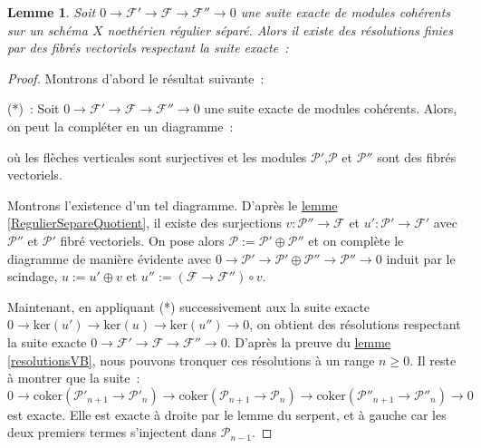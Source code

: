 \documentclass{amsart}
\newcommand{\sref}[2]{\hyperref[#2]{#1 \ref*{#2}}}
\theoremstyle{plain}
\newtheorem{lem}[theo]{Lemme}
\theoremstyle{definition}
\theoremstyle{remark}
\newcommand{\ra}{\rightarrow}
\newcommand{\exa}[3]{0\ra {#1}\ra {#2}\ra {#3}\ra 0}
\newcommand{\myker}[1]{\mathrm{ker}({#1})}
\newcommand{\coker}[1]{\mathrm{coker}({#1})}
\begin{document}
\begin{lem}\label{ferAChevalVB}
  Soit $\exa{\mathcal{F}'}{\mathcal{F}}{\mathcal{F}''}$ une suite exacte de modules cohérents sur un schéma $X$ noethérien régulier séparé.
  Alors il existe des résolutions finies par des fibrés vectoriels respectant la suite exacte~:
  \begin{center}
  \end{center}
\end{lem}

\begin{proof}
  Montrons d'abord le résultat suivante~:
  
  (*)~: Soit $\exa{\mathcal{F}'}{\mathcal{F}}{\mathcal{F}''}$ une suite exacte de modules cohérents. Alors, on peut la compléter en un diagramme~:
  \begin{center}
  \end{center}
  où les flèches verticales sont surjectives et les modules $\mathcal{P}'$,$\mathcal{P}$ et $\mathcal{P}''$ sont des fibrés vectoriels.
  
  Montrons l'existence d'un tel diagramme. D'après le \sref{lemme}{RegulierSepareQuotient}, il existe des surjections $v:\mathcal{P}''\ra\mathcal{F}$
  et $u':\mathcal{P}'\ra\mathcal{F}'$ avec $\mathcal{P}''$ et $\mathcal{P}'$ fibré vectoriels.
  On pose alors $\mathcal{P}:=\mathcal{P}'\oplus\mathcal{P}''$ et on complète le diagramme de manière évidente avec
  $\exa{\mathcal{P}'}{\mathcal{P}'\oplus\mathcal{P}''}{\mathcal{P}''}$ induit par le scindage, $u:=u'\oplus v$ et 
  $u'':=(\mathcal{F}\ra\mathcal{F}'')\circ v$.

  Maintenant, en appliquant (*) successivement aux la suite exacte $\exa{\myker{u'}}{\myker{u}}{\myker{u''}}$, on obtient des résolutions 
  respectant la suite exacte $\exa{\mathcal{F}'}{\mathcal{F}}{\mathcal{F}''}$. D'après la preuve du \sref{lemme}{resolutionsVB}, nous
  pouvons tronquer ces résolutions à un range $n\geq 0$. Il reste à montrer que la suite~:
  $$\exa{\coker{\mathcal{P}'_{n+1}\ra\mathcal{P}'_{n}}}{\coker{\mathcal{P}_{n+1}\ra\mathcal{P}_{n}}}{\coker{\mathcal{P}''_{n+1}\ra\mathcal{P}''_{n}}}$$
  est exacte. Elle est exacte à droite par le lemme du serpent, et à gauche car les deux premiers termes s'injectent dans $\mathcal{P}_{n-1}$.
\end{proof}
\end{document}
